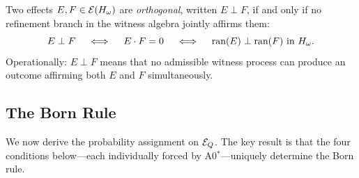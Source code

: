 \begin{definition}
\label{def:orthogonality}
Two effects $E, F \in \mathcal{E}(H_\omega)$ are \emph{orthogonal},
written $E \perp F$, if and only if no refinement branch in the witness
algebra jointly affirms them:
\[
  E \perp F
  \quad\iff\quad
  E \cdot F = 0
  \quad\iff\quad
  \text{ran}(E) \perp \text{ran}(F) \text{ in } H_\omega.
\]
Operationally: $E \perp F$ means that no admissible witness process can
produce an outcome affirming both $E$ and $F$ simultaneously.

\end{definition}

\subsection{The Born Rule}
\label{sec:context-born:born}

We now derive the probability assignment on $\mathcal{E}_Q$.  The key
result is that the four conditions below---each individually forced by
A0$^*$---uniquely determine the Born rule.

